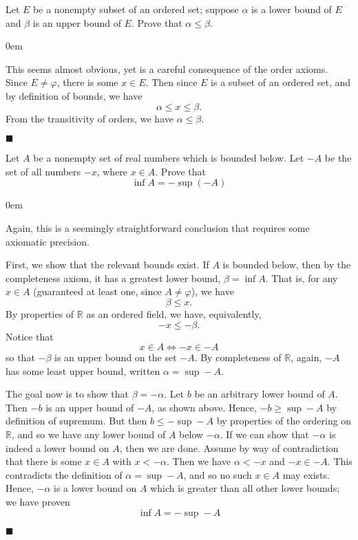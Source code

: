 \documentclass[12pt]{article}
\renewcommand{\qed}{\hfill$\blacksquare$}
\renewenvironment{proof}{\begin{addmargin}[1em]{0em}\begin{newproof}}{\end{newproof}\end{addmargin}\qed}
\newenvironment{problem}[2][Exercise]{\begin{trivlist}
\item[\hskip \labelsep {\bfseries #1}\hskip \labelsep {\bfseries #2.}]}{\end{trivlist}}
\begin{document}
\begin{problem}{1.4}
Let $E$ be a nonempty subset of an ordered set; suppose $\alpha$ is a lower bound of $E$ and $\beta$ is an upper bound of $E$. Prove that $\alpha \leq \beta$.
\end{problem}
\begin{proof}
This seems almost obvious, yet is a careful consequence of the order axioms. Since $E \neq \varphi$, there is some $x \in E$. Then since $E$ is a subset of an ordered set, and by definition of bounds, we have $$ \alpha \leq x \leq \beta. $$ From the transitivity of orders, we have $\alpha \leq \beta$.
\end{proof}

\begin{problem}{1.5}
Let $A$ be a nonempty set of real numbers which is bounded below. Let $- A$ be the set of all numbers $-x$, where $x\in A$. Prove that $$ \inf A = -\sup \left(-A\right) $$
\end{problem}
\begin{proof}
Again, this is a seemingly straightforward conclusion that requires some axiomatic precision.

First, we show that the relevant bounds exist. If $A$ is bounded below, then by the completeness axiom, it has a greatest lower bound, $\beta = \inf A$. That is, for any $x\in A$ (guaranteed at least one, since $A\neq \varphi$), we have $$ \beta \leq x. $$ By properties of $\mathbb{R}$ as an ordered field, we have, equivalently, $$ -x \leq -\beta. $$ Notice that $$ x\in A \iff -x \in -A $$ so that $-\beta$ is an upper bound on the set $-A$. By completeness of $\mathbb{R}$, again, $-A$ has some least upper bound, written $\alpha = \sup -A$.

The goal now is to show that $\beta = -\alpha$. Let $b$ be an arbitrary lower bound of $A$. Then $-b$ is an upper bound of $-A$, as shown above. Hence, $-b \geq \sup -A$ by definition of supremum. But then $b \leq -\sup -A$ by properties of the ordering on $\mathbb{R}$, and so we have any lower bound of $A$ below $-\alpha$. If we can show that $-\alpha$ is indeed a lower bound on $A$, then we are done. Assume by way of contradiction that there is some $x\in A$ with $x < -\alpha$. Then we have $\alpha < -x$ and $-x \in -A$. This contradicts the definition of $\alpha = \sup -A$, and so no such $x\in A$ may exists. Hence, $-\alpha$ is a lower bound on $A$ which is greater than all other lower bounds; we have proven $$ \inf A = -\sup -A $$
\end{proof}
\end{document}
